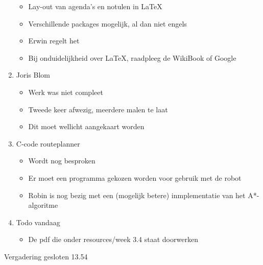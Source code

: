 \documentclass[dutch]{article}
\begin{document}
\begin{enumerate}
\begin{itemize}
		\item Lay-out van agenda's en notulen in LaTeX
		\item Verschillende packages mogelijk, al dan niet engels
		\item Erwin regelt het
		\item Bij onduidelijkheid over LaTeX, raadpleeg de WikiBook of Google
	\end{itemize}
	\item Joris Blom
	\begin{itemize}
		\item Werk was niet compleet
		\item Tweede keer afwezig, meerdere malen te laat
		\item Dit moet wellicht aangekaart worden
	\end{itemize}
	\item C-code routeplanner
	\begin{itemize}
		\item Wordt nog besproken
		\item Er moet een programma gekozen worden voor gebruik met de robot
		\item Robin is nog bezig met een (mogelijk betere) inmplementatie van het A*-algoritme
	\end{itemize}
	\item Todo vandaag
	\begin{itemize}
		\item De pdf die onder resources/week 3.4 staat doorwerken
	\end{itemize}

\end{enumerate}
Vergadering gesloten 13.54 \newline
\end{document}
